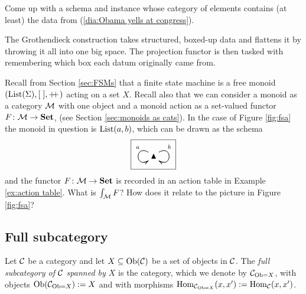 \begin{exercise}
Come up with a schema and instance whose category of elements contains (at least) the data from (\ref{dia:Obama yells at congress}).
\end{exercise}

\begin{slogan}
The Grothendieck construction takes structured, boxed-up data and flattens it by throwing it all into one big space. The projection functor is then tasked with remembering which box each datum originally came from.
\end{slogan}

\begin{exercise}\label{exc:FSM as elements of monoid action}
Recall from Section \ref{sec:FSMs} that a finite state machine is a free monoid $(\textnormal{List}(\Sigma),[\;],+\!\!+\hspace{1pt})$ acting on a set $X$. Recall also that we can consider a monoid as a category $\mathcal{M}$ with one object and a monoid action as a set-valued functor $F\colon\mathcal{M}\rightarrow{\bf Set}$, (see Section \ref{sec:monoids as cats}). In the case of Figure \ref{fig:fsa} the monoid in question is $\textnormal{List}(a,b)$, which can be drawn as the schema
$$\fbox{\xymatrix{\monOb\ar@(ul,dl)[]_(.3)a\ar@(ul,dl)[]_(.7){~}\ar@(ur,dr)[]^(.3)b\ar@(ur,dr)[]^(.7){~}}}$$
and the functor $F\colon\mathcal{M}\rightarrow{\bf Set}$ is recorded in an action table in Example \ref{ex:action table}. What is $\int_\mathcal{M} F$? How does it relate to the picture in Figure \ref{fig:fsa}?
\end{exercise}


\subsection{Full subcategory}

\begin{definition}\label{def:full subcategory}

Let $\mathcal{C}$ be a category and let $X\subseteq\textnormal{Ob}(\mathcal{C})$ be a set of objects in $\mathcal{C}$. The {\em full subcategory of $\mathcal{C}$ spanned by $X$} is the category, which we denote by $\mathcal{C}_{\textnormal{Ob}=X}$, with objects $\textnormal{Ob}(\mathcal{C}_{\textnormal{Ob}=X}):=X$ and with morphisms $\textnormal{Hom}_{\mathcal{C}_{\textnormal{Ob}=X}}(x,x'):=\textnormal{Hom}_\mathcal{C}(x,x')$.

\end{definition}

